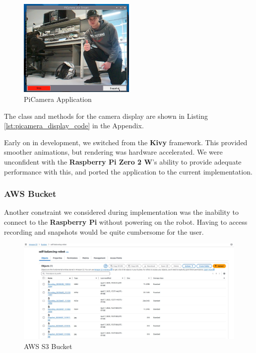 \documentclass{article}
\begin{document}
\begin{figure}[H]
    \centering
    \includegraphics[width=0.5\textwidth]{Figures/PiCamera_App.jpg}
    \caption{PiCamera Application}
    \label{fig:camera_app}
\end{figure}

\begin{center}
    The class and methods for the camera display are shown in Listing \ref{lst:picamera_display_code} in the Appendix. \\
\end{center}


\begin{minipage}{\linewidth}
    Early on in development, we switched from the \textbf{Kivy} framework. This provided smoother animations, but rendering was
    hardware accelerated. We were unconfident with the \textbf{Raspberry Pi Zero 2 W}'s ability to provide adequate performance with this,
    and ported the application to the current implementation.
\end{minipage}

\subsubsection{AWS Bucket}

\begin{minipage}{\linewidth}
    Another constraint we considered during implementation was the inability to
    connect to the \textbf{Raspberry Pi} without powering on the robot. Having to access recording and snapshots
    would be quite cumbersome for the user. \\
\end{minipage}

\begin{figure}[H]
    \centering
    \includegraphics[width=1\textwidth]{Figures/S3Bucket_Files.jpg}
    \caption{AWS S3 Bucket}
    \label{fig:s3_bucket}
\end{figure}
\end{document}
